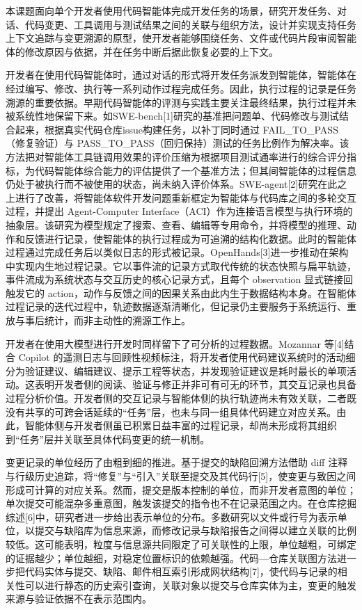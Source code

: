 本课题面向单个开发者使用代码智能体完成开发任务的场景，研究开发任务、对话、代码变更、工具调用与测试结果之间的关联与组织方法，设计并实现支持任务上下文追踪与变更溯源的原型，使开发者能够围绕任务、文件或代码片段审阅智能体的修改原因与依据，并在任务中断后据此恢复必要的上下文。



开发者在使用代码智能体时，通过对话的形式将开发任务派发到智能体，智能体在经过编写、修改、执行等一系列动作过程完成任务。因此，执行过程的记录是任务溯源的重要依据。早期代码智能体的评测与实践主要关注最终结果，执行过程并未被系统性地保留下来。如SWE-bench[1]研究的基准把问题单、代码修改与测试结合起来，根据真实代码仓库issue构建任务，以补丁同时通过 FAIL_TO_PASS（修复验证）与 PASS_TO_PASS（回归保持）测试的任务比例作为解决率。该方法把对智能体工具链调用效果的评价压缩为根据项目测试通率进行的综合评分指标，为代码智能体综合能力的评估提供了一个基准方法；但其间智能体的过程信息仍处于被执行而不被使用的状态，尚未纳入评价体系。SWE-agent[2]研究在此之上进行了改善，将智能体软件开发问题重新框定为智能体与代码库之间的多轮交互过程，并提出 Agent-Computer Interface（ACI）作为连接语言模型与执行环境的抽象层。该研究为模型规定了搜索、查看、编辑等专用命令，并将模型的推理、动作和反馈进行记录，使智能体的执行过程成为可追溯的结构化数据。此时的智能体过程通过完成任务后以类似日志的形式被记录。OpenHands[3]进一步推动在架构中实现内生地过程记录。它以事件流的记录方式取代传统的状态快照与扁平轨迹，事件流成为系统状态与交互历史的核心记录方式，且每个 observation 显式链接回触发它的 action，动作与反馈之间的因果关系由此内生于数据结构本身。在智能体过程记录的迭代过程中，轨迹数据逐渐清晰化，但记录仍主要服务于系统运行、重放与事后统计，而非主动性的溯源工作上。

开发者在使用大模型进行开发时同样留下了可分析的过程数据。Mozannar 等[4]结合 Copilot 的遥测日志与回顾性视频标注，将开发者使用代码建议系统时的活动细分为验证建议、编辑建议、提示工程等状态，并发现验证建议是耗时最长的单项活动。这表明开发者侧的阅读、验证与修正并非可有可无的环节，其交互记录也具备过程分析价值。开发者侧的交互记录与智能体侧的执行轨迹尚未有效关联，二者既没有共享的可跨会话延续的“任务”层，也未与同一组具体代码建立对应关系。由此，智能体侧与开发者侧虽已积累日益丰富的过程记录，却尚未形成将其组织到“任务”层并关联至具体代码变更的统一机制。


变更记录的单位经历了由粗到细的推进。基于提交的缺陷回溯方法借助 diff 注释与行级历史追踪，将“修复”与“引入”关联至提交及其代码行[5]，使变更与致因之间形成可计算的对应关系。然而，提交是版本控制的单位，而非开发者意图的单位；单次提交可能混杂多重意图，触发该提交的指令也不在记录范围之内。在仓库挖掘综述[6]中，研究者进一步给出表示单位的分布。多数研究以文件或行号为表示单位，以提交与缺陷库为信息来源，而修改记录与缺陷报告之间得以建立关联的比例较低。这可能表明，粒度与信息源共同限定了可关联性的上限，单位越粗，可绑定的证据越少；单位越细，对稳定位置标识的依赖越强。代码—仓库关联图方法进一步把代码实体与提交、缺陷、邮件相互索引形成网状结构[7]，使代码与记录的相关性可以进行静态的历史索引查询，关联对象以提交与仓库实体为主，变更的触发来源与验证依据不在表示范围内。

